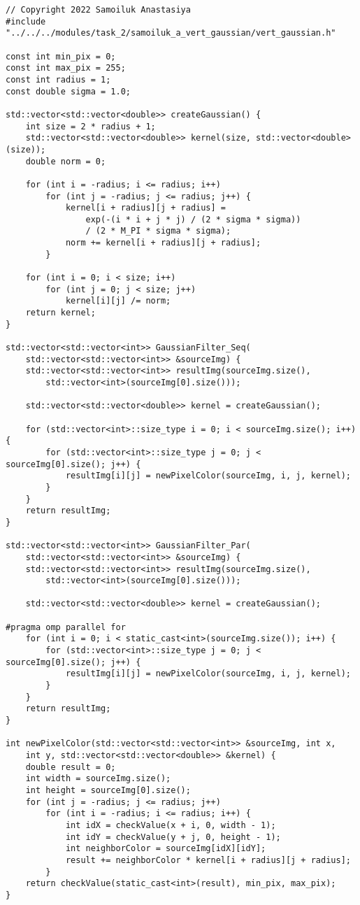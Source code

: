 \documentclass{report}
\begin{document}
\begin{lstlisting}
// Copyright 2022 Samoiluk Anastasiya
#include "../../../modules/task_2/samoiluk_a_vert_gaussian/vert_gaussian.h"

const int min_pix = 0;
const int max_pix = 255;
const int radius = 1;
const double sigma = 1.0;

std::vector<std::vector<double>> createGaussian() {
    int size = 2 * radius + 1;
    std::vector<std::vector<double>> kernel(size, std::vector<double>(size));
    double norm = 0;

    for (int i = -radius; i <= radius; i++)
        for (int j = -radius; j <= radius; j++) {
            kernel[i + radius][j + radius] =
                exp(-(i * i + j * j) / (2 * sigma * sigma))
                / (2 * M_PI * sigma * sigma);
            norm += kernel[i + radius][j + radius];
        }

    for (int i = 0; i < size; i++)
        for (int j = 0; j < size; j++)
            kernel[i][j] /= norm;
    return kernel;
}

std::vector<std::vector<int>> GaussianFilter_Seq(
    std::vector<std::vector<int>> &sourceImg) {
    std::vector<std::vector<int>> resultImg(sourceImg.size(),
        std::vector<int>(sourceImg[0].size()));

    std::vector<std::vector<double>> kernel = createGaussian();

    for (std::vector<int>::size_type i = 0; i < sourceImg.size(); i++) {
        for (std::vector<int>::size_type j = 0; j < sourceImg[0].size(); j++) {
            resultImg[i][j] = newPixelColor(sourceImg, i, j, kernel);
        }
    }
    return resultImg;
}

std::vector<std::vector<int>> GaussianFilter_Par(
    std::vector<std::vector<int>> &sourceImg) {
    std::vector<std::vector<int>> resultImg(sourceImg.size(),
        std::vector<int>(sourceImg[0].size()));

    std::vector<std::vector<double>> kernel = createGaussian();

#pragma omp parallel for
    for (int i = 0; i < static_cast<int>(sourceImg.size()); i++) {
        for (std::vector<int>::size_type j = 0; j < sourceImg[0].size(); j++) {
            resultImg[i][j] = newPixelColor(sourceImg, i, j, kernel);
        }
    }
    return resultImg;
}

int newPixelColor(std::vector<std::vector<int>> &sourceImg, int x,
    int y, std::vector<std::vector<double>> &kernel) {
    double result = 0;
    int width = sourceImg.size();
    int height = sourceImg[0].size();
    for (int j = -radius; j <= radius; j++)
        for (int i = -radius; i <= radius; i++) {
            int idX = checkValue(x + i, 0, width - 1);
            int idY = checkValue(y + j, 0, height - 1);
            int neighborColor = sourceImg[idX][idY];
            result += neighborColor * kernel[i + radius][j + radius];
        }
    return checkValue(static_cast<int>(result), min_pix, max_pix);
}


\end{lstlisting}
\end{document}
